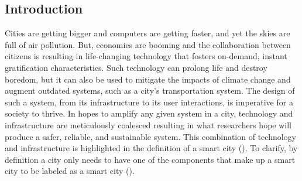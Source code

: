 \documentclass[12pt]{article}
\begin{document}


\subsection*{Introduction}
Cities are getting bigger and computers are getting faster, and yet the skies are full of air pollution. But, economies are booming and the collaboration between citizens is resulting in life-changing technology that fosters on-demand, instant gratification characteristics. Such technology can prolong life and destroy boredom, but it can also be used to mitigate the impacts of climate change and augment outdated systems, such as a city's transportation system. The design of such a system, from its infrastructure to its user interactions, is imperative for a society to thrive. In hopes to amplify any given system in a city, technology and infrastructure are meticulously coalesced resulting in what researchers hope will produce a safer, reliable, and sustainable system. This combination of technology and infrastructure is highlighted in the definition of a smart city (\cite{montoya2017acceso}). To clarify, by definition a city only needs to have one of the components that make up a smart city to be labeled as a smart city (\cite{montoya2017acceso}). 
\end{document}
